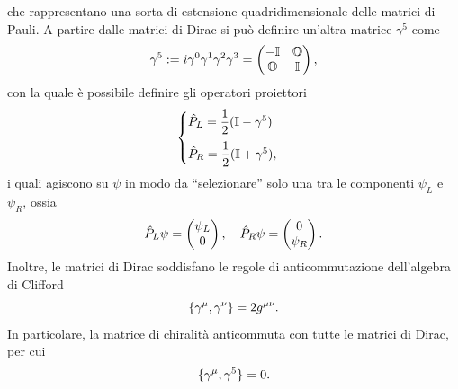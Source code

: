 che rappresentano una sorta di estensione quadridimensionale delle matrici di Pauli. A partire dalle matrici di Dirac si può definire un'altra matrice $\gamma^5$ come
\begin{equation}
    \gamma^5 := i\gamma^0\gamma^1\gamma^2\gamma^3 = 
    \begin{pmatrix}
        -\mathbb{I} & \mathbb{O} \\
        \mathbb{O} & \mathbb{I}
    \end{pmatrix},
\end{equation}
con la quale è possibile definire gli operatori proiettori 
\begin{equation}
\label{eq: proiettori rappr. Dirac}
    \begin{cases}
        \hat{P}_{L} = \dfrac{1}{2}(\mathbb{I} - \gamma^5) \\[2ex]
        \hat{P}_R = \dfrac{1}{2}(\mathbb{I} + \gamma^5),
    \end{cases}
\end{equation}
i quali agiscono su $\psi$ in modo da ``selezionare'' solo una tra le componenti $\psi_L$ e $\psi_R$, ossia
\begin{equation}
    \hat{P}_L\psi = 
    \begin{pmatrix}
        \psi_L \\
        0
    \end{pmatrix},\quad
    \hat{P}_R\psi = 
    \begin{pmatrix}
        0 \\
        \psi_R
    \end{pmatrix}.
\end{equation}
Inoltre, le matrici di Dirac soddisfano le regole di anticommutazione dell'algebra di Clifford
\begin{equation}
\label{eq: algebra di Clifford}
    \{\gamma^\mu,\gamma^\nu\} = 2g^{\mu\nu}.
\end{equation}
In particolare, la matrice di chiralità anticommuta con tutte le matrici di Dirac, per cui
\begin{equation}
    \{\gamma^\mu,\gamma^5\} = 0.
\end{equation}






